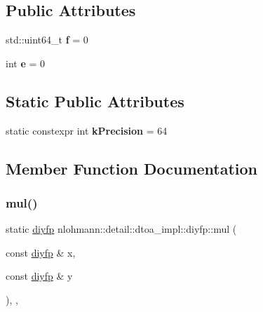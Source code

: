 \subsection*{Public Attributes}
\begin{DoxyCompactItemize}
\item 
\mbox{\label{structnlohmann_1_1detail_1_1dtoa__impl_1_1diyfp_aea90459e340a231ca31d46946803ef51}} 
std\+::uint64\+\_\+t {\bfseries f} = 0
\item 
\mbox{\label{structnlohmann_1_1detail_1_1dtoa__impl_1_1diyfp_ae22e170815983961447c429f324c944d}} 
int {\bfseries e} = 0
\end{DoxyCompactItemize}
\subsection*{Static Public Attributes}
\begin{DoxyCompactItemize}
\item 
\mbox{\label{structnlohmann_1_1detail_1_1dtoa__impl_1_1diyfp_a03682754b06ed4f30b263119eecc2d52}} 
static constexpr int {\bfseries k\+Precision} = 64
\end{DoxyCompactItemize}


\subsection{Member Function Documentation}
\mbox{\label{structnlohmann_1_1detail_1_1dtoa__impl_1_1diyfp_aa5f250d12ce89c81fdb08900c6a823e8}} 
\subsubsection{\texorpdfstring{mul()}{mul()}}
{\footnotesize\ttfamily static \hyperlink{structnlohmann_1_1detail_1_1dtoa__impl_1_1diyfp}{diyfp} nlohmann\+::detail\+::dtoa\+\_\+impl\+::diyfp\+::mul (\begin{DoxyParamCaption}\item[{const \hyperlink{structnlohmann_1_1detail_1_1dtoa__impl_1_1diyfp}{diyfp} \&}]{x,  }\item[{const \hyperlink{structnlohmann_1_1detail_1_1dtoa__impl_1_1diyfp}{diyfp} \&}]{y }\end{DoxyParamCaption})\hspace{0.3cm}{\ttfamily [inline]}, {\ttfamily [static]}, {\ttfamily [noexcept]}}



